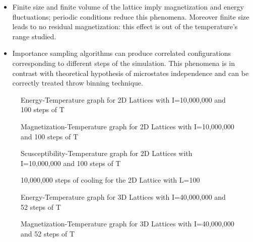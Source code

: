 \documentclass[11pt,a4paper]{article}
\begin{document}
\begin{itemize}
\item Finite size and finite volume of the lattice imply magnetization and energy fluctuations; periodic conditions reduce this phenomena. Moreover finite size leads to no residual magnetization: this effect is out of the temperature's range studied.

\item Importance sampling algorithms can produce correlated configurations corresponding to different steps of the simulation. This phenomena is in contrast with theoretical hypothesis of microstates independence and can be correctly treated throw binning technique. 

\end{itemize}


\begin{figure}[h!]
  \centering
  
  \caption{Energy-Temperature graph for 2D Lattices with I=10,000,000 and 100 steps of T}
\end{figure}

\begin{figure}[h!]
  \centering

  \caption{Magnetization-Temperature graph for 2D Lattices with I=10,000,000 and 100 steps of T}
\end{figure}

\begin{figure}[h!]
  \centering
 
  \caption{Scusceptibility-Temperature graph for 2D Lattices with I=10,000,000 and 100 steps of T}
\end{figure}

\begin{figure}[h!]
  \centering
  
  \caption{10,000,000 steps of cooling for the 2D Lattice with L=100}
\end{figure}

\begin{figure}[h!]
  \centering
  
  \caption{Energy-Temperature graph for 3D Lattices with I=40,000,000 and 52 steps of T}
\end{figure}

\begin{figure}[h!]
  \centering
 
  \caption{Magnetization-Temperature graph for 3D Lattices with I=40,000,000 and 52 steps of T}
\end{figure}
\end{document}
